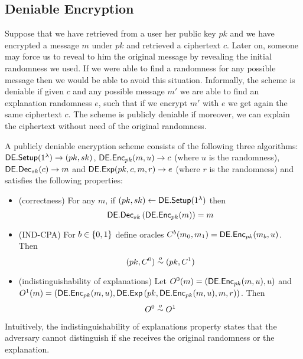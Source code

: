 \subsection{Deniable Encryption}
Suppose that we have retrieved from a user her public key $pk$ and we have encrypted a message $m$ under $pk$ and retrieved a ciphertext $c$. Later on, someone may force us to reveal to him the original message by revealing the initial randomness we used. If we were able to find a randomness for any possible message then we would be able to avoid this situation. Informally, the scheme is deniable if given $c$ and any possible message $m'$ we are able to find an explanation randomness $e$, such that if we encrypt $m'$ with $e$ we get again the same ciphertext $c$. The scheme is publicly deniable if moreover, we can explain the ciphertext without need of the original randomness.

\begin{mydef}
A publicly deniable encryption scheme consists of the following three algorithms: $\mathsf{DE.Setup}(1^\lambda)\to(pk,sk)$, $\mathsf{DE.Enc}_{pk}(m,u)\to c$ (where $u$ is the randomness), $\mathsf{DE.Dec}_{sk}(c)\to m$ and $\mathsf{DE.Exp}(pk,c,m,r)\to e$ (where $r$ is the randomness) and satisfies the following properties:
\begin{itemize}
\item (correctness) For any $m$, if $(pk,sk)\gets \mathsf{DE.Setup}(1^\lambda)$ then
\[
\mathsf{DE.Dec}_{sk}\left(\mathsf{DE.Enc}_{pk}(m)\right)=m
\]
\item (IND-CPA) For $b\in\{0,1\}$ define oracles $C^b(m_0,m_1)=\mathsf{DE.Enc}_{pk}(m_b,u)$. Then
\[
(pk,C^0)\overset{o}{\sim}(pk,C^1)
\]
\item (indistinguishability of explanations) Let $O^0(m)=\left(\mathsf{DE.Enc}_{pk}(m,u),u\right)$ and $O^1(m)=\left(\mathsf{DE.Enc}_{pk}(m,u),\mathsf{DE.Exp}\left(pk,\mathsf{DE.Enc}_{pk}(m,u),m,r\right)\right)$. Then
\[
O^0\overset{o}{\sim} O^1
\]
\end{itemize}
\end{mydef}
Intuitively, the indistinguishability of explanations property states that the adversary cannot distinguish if she receives the original randomness or the explanation.
